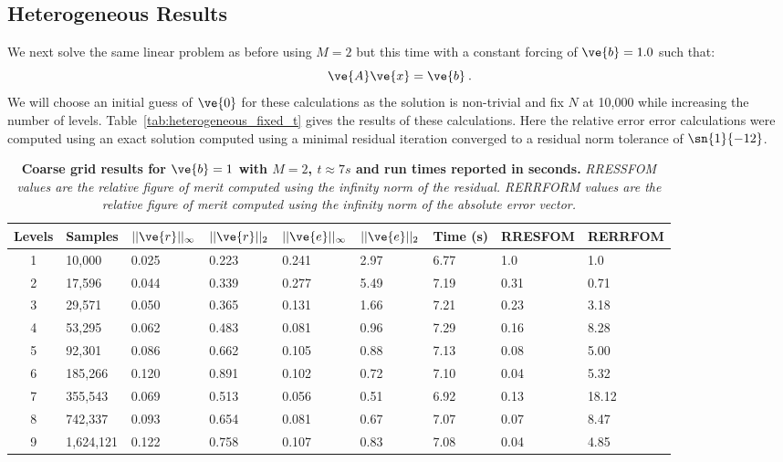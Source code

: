 \documentclass[note]{TechNote}
\begin{document}
\subsection{Heterogeneous Results}
We next solve the same linear problem as before using $M=2$ but this
time with a constant forcing of $\ve{b}=1.0$ such that:
\begin{equation}
  \ve{A}\ve{x} = \ve{b}\:.
  \label{eq:heterogeneous_problem}
\end{equation}
We will choose an initial guess of $\ve{0}$ for these calculations as
the solution is non-trivial and fix $N$ at 10,000 while increasing the
number of levels. Table~\ref{tab:heterogeneous_fixed_t} gives the
results of these calculations. Here the relative error error
calculations were computed using an exact solution computed using a
minimal residual iteration converged to a residual norm tolerance of
$\sn{1}{-12}$.
\begin{table}[h!]
  \begin{center}
    \begin{tabular}{cllllllll}\hline\hline
      \multicolumn{1}{c}{\textbf{Levels}} &
      \multicolumn{1}{l}{\textbf{Samples}} &
      \multicolumn{1}{l}{\textbf{$||\ve{r}||_{\infty}$}} &
      \multicolumn{1}{l}{\textbf{$||\ve{r}||_{2}$}} &
      \multicolumn{1}{l}{\textbf{$||\ve{e}||_{\infty}$}} &
      \multicolumn{1}{l}{\textbf{$||\ve{e}||_{2}$}} &
      \multicolumn{1}{l}{\textbf{Time (s)}} &
      \multicolumn{1}{l}{\textbf{RRESFOM}} &
      \multicolumn{1}{l}{\textbf{RERRFOM}} \\
      \hline
      1 & 10,000 & 0.025 & 0.223 & 0.241 & 2.97 & 6.77 & 1.0 & 1.0 \\
      2 & 17,596 & 0.044 & 0.339 & 0.277 & 5.49 & 7.19 & 0.31 & 0.71 \\
      3 & 29,571 & 0.050 & 0.365 & 0.131 & 1.66 & 7.21 & 0.23 & 3.18 \\
      4 & 53,295 & 0.062 & 0.483 & 0.081 & 0.96 & 7.29 & 0.16 & 8.28 \\
      5 & 92,301 & 0.086 & 0.662 & 0.105 & 0.88 & 7.13 & 0.08 & 5.00 \\
      6 & 185,266 & 0.120 & 0.891 & 0.102 & 0.72 & 7.10 & 0.04 & 5.32 \\
      7 & 355,543 & 0.069 & 0.513 & 0.056 & 0.51 & 6.92 & 0.13 & 18.12 \\
      8 & 742,337 & 0.093 & 0.654 & 0.081 & 0.67 & 7.07 & 0.07 & 8.47 \\
      9 & 1,624,121 & 0.122 & 0.758 & 0.107 & 0.83 & 7.08 & 0.04 &
      4.85 \\
      \hline\hline
    \end{tabular}
  \end{center}
  \caption{\textbf{Coarse grid results for $\ve{b} = 1$ with $M = 2$,
      $t \approx 7s$ and run times reported in seconds.}
    \textit{RRESSFOM values are the relative figure of merit computed
      using the infinity norm of the residual. RERRFORM values are the
      relative figure of merit computed using the infinity norm of the
      absolute error vector.}}
  \label{tab:heterogeneous_coarse_grids}
\end{table}
\end{document}
